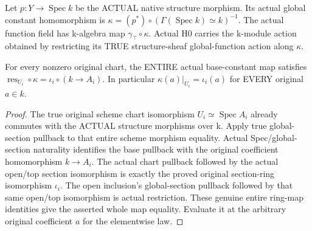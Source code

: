 \begin{definition}
\label{def:seven-native-actual-base-actions}
\leanok
Let $p:Y\to\operatorname{Spec}k$ be the ACTUAL native structure morphism.
Its actual global constant homomorphism is
$\kappa=(p^*)\circ(\Gamma(\operatorname{Spec}k)\simeq k)^{-1}$.
The actual function field has k-algebra map $\gamma_\top\circ\kappa$.
Actual H0 carries the k-module action obtained by restricting its TRUE
structure-sheaf global-function action along $\kappa$.
\end{definition}

\begin{theorem}
\label{thm:seven-native-actual-base-chart-law}
\leanok
For every nonzero original chart, the ENTIRE actual base-constant map
satisfies $\operatorname{res}_{U_i}\circ\kappa=\iota_i\circ(k\to A_i)$.
In particular $\kappa(a)|_{U_i}=\iota_i(a)$ for EVERY original $a\in k$.
\end{theorem}
\begin{proof}
The true original scheme chart isomorphism
$U_i\simeq\operatorname{Spec}A_i$ already commutes with the ACTUAL structure
morphisms over k. Apply true global-section pullback to that entire scheme
morphism equality. Actual Spec/global-section naturality identifies the
base pullback with the original coefficient homomorphism $k\to A_i$.
The actual chart pullback followed by the actual open/top section
isomorphism is exactly the proved original section-ring isomorphism
$\iota_i$. The open inclusion's global-section pullback followed by that
same open/top isomorphism is actual restriction. These genuine entire
ring-map identities give the asserted whole map equality. Evaluate it at
the arbitrary original coefficient $a$ for the elementwise law.
\end{proof}

